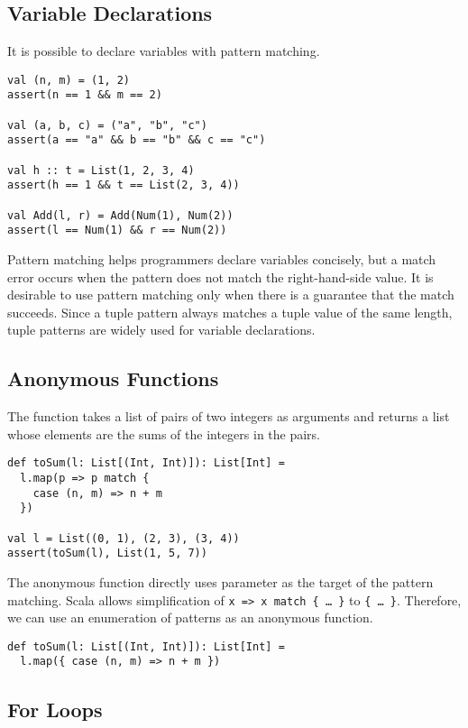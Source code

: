 \subsection{Variable Declarations}

It is possible to declare variables with pattern matching.

\begin{verbatim}
val (n, m) = (1, 2)
assert(n == 1 && m == 2)

val (a, b, c) = ("a", "b", "c")
assert(a == "a" && b == "b" && c == "c")

val h :: t = List(1, 2, 3, 4)
assert(h == 1 && t == List(2, 3, 4))

val Add(l, r) = Add(Num(1), Num(2))
assert(l == Num(1) && r == Num(2))
\end{verbatim}

Pattern matching helps programmers declare variables concisely, but a match error occurs
when the pattern does not match the right-hand-side value. It is desirable to use
pattern matching only when there is a guarantee that the match succeeds. Since
a tuple pattern always matches a tuple value of the same length,
tuple patterns are widely used for variable declarations.

\subsection{Anonymous Functions}

The function  takes a list of pairs of two integers as arguments and
returns a list whose elements are the sums of the integers in the pairs.

\begin{verbatim}
def toSum(l: List[(Int, Int)]): List[Int] =
  l.map(p => p match {
    case (n, m) => n + m
  })

val l = List((0, 1), (2, 3), (3, 4))
assert(toSum(l), List(1, 5, 7))
\end{verbatim}

The anonymous function directly uses parameter  as the target of the
pattern matching. Scala allows simplification of \verb!x => x match { … }! to
\verb!{ … }!. Therefore, we can use an enumeration of patterns as an anonymous
function.

\begin{verbatim}
def toSum(l: List[(Int, Int)]): List[Int] =
  l.map({ case (n, m) => n + m })
\end{verbatim}

\subsection{For Loops}

